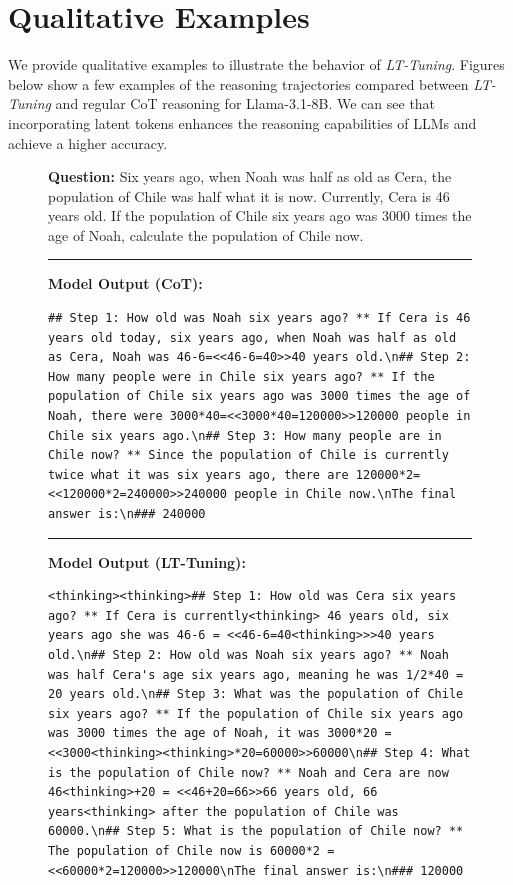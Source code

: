 \documentclass{article}
\theoremstyle{plain}
\theoremstyle{definition}
\theoremstyle{remark}
\begin{document}
\section{Qualitative Examples}
\label{app:examples}

We provide qualitative examples to illustrate the behavior of \textit{LT-Tuning}. Figures below show a few examples of the reasoning trajectories compared between \textit{LT-Tuning} and regular CoT reasoning for Llama-3.1-8B. We can see that incorporating latent tokens enhances the reasoning capabilities of LLMs and achieve a higher accuracy.


\begin{figure}[h]
\centering
\begin{tcolorbox}[colback=blue!5, colframe=blue!50, title=Example 1]
\textbf{Question:} Six years ago, when Noah was half as old as Cera, the population of Chile was half what it is now. Currently, Cera is 46 years old. If the population of Chile six years ago was 3000 times the age of Noah, calculate the population of Chile now.

\rule{\linewidth}{0.7pt}

\textbf{Model Output (CoT):}

\begin{lstlisting}
## Step 1: How old was Noah six years ago? ** If Cera is 46 years old today, six years ago, when Noah was half as old as Cera, Noah was 46-6=<<46-6=40>>40 years old.\n## Step 2: How many people were in Chile six years ago? ** If the population of Chile six years ago was 3000 times the age of Noah, there were 3000*40=<<3000*40=120000>>120000 people in Chile six years ago.\n## Step 3: How many people are in Chile now? ** Since the population of Chile is currently twice what it was six years ago, there are 120000*2=<<120000*2=240000>>240000 people in Chile now.\nThe final answer is:\n### 240000
\end{lstlisting}
\rule{\linewidth}{0.7pt}
\textbf{Model Output (LT-Tuning):}
\begin{lstlisting}
<thinking><thinking>## Step 1: How old was Cera six years ago? ** If Cera is currently<thinking> 46 years old, six years ago she was 46-6 = <<46-6=40<thinking>>>40 years old.\n## Step 2: How old was Noah six years ago? ** Noah was half Cera's age six years ago, meaning he was 1/2*40 = 20 years old.\n## Step 3: What was the population of Chile six years ago? ** If the population of Chile six years ago was 3000 times the age of Noah, it was 3000*20 = <<3000<thinking><thinking>*20=60000>>60000\n## Step 4: What is the population of Chile now? ** Noah and Cera are now 46<thinking>+20 = <<46+20=66>>66 years old, 66 years<thinking> after the population of Chile was 60000.\n## Step 5: What is the population of Chile now? ** The population of Chile now is 60000*2 = <<60000*2=120000>>120000\nThe final answer is:\n### 120000
\end{lstlisting}
\end{tcolorbox}
\label{fig:example1}
\end{figure}
\end{document}
